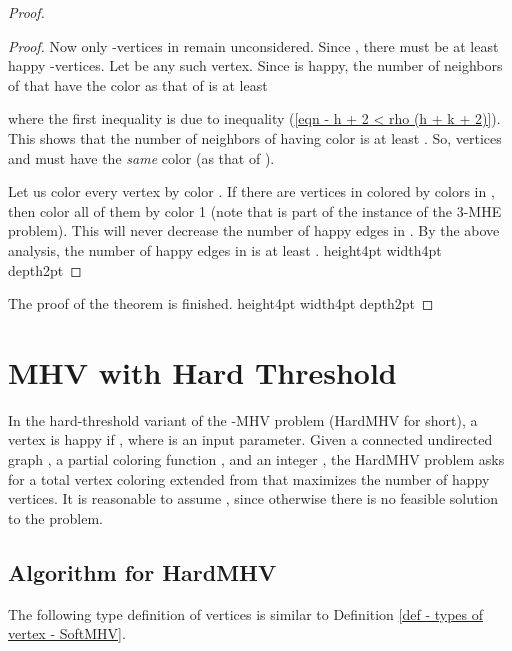 \documentclass[11pt]{article}
\newcommand{\qed}{\vrule height4pt width4pt depth2pt}
\begin{document}
\begin{proof}
\begin{proof}
Now only -vertices in  remain unconsidered.
Since , there must be at least 
happy -vertices. Let  be any such vertex.
Since  is happy, the number of neighbors of 
that have the color as that of  is at least

where the first inequality is due to inequality
(\ref{eqn - h + 2 < rho (h + k + 2)}).
This shows that the number of neighbors of  having color
 is at least . So, vertices  and  must have
the {\em same} color (as that of ).

Let us color every vertex  by color .
If there are vertices in  colored by colors in ,
then color all of them by color 1 (note that  is part of the instance of
the 3-MHE problem). This will never decrease the number of happy edges
in . By the above analysis, the number of happy edges in  is
at least .
\qed
\end{proof}

The proof of the theorem is finished.
\qed
\end{proof}




\section{MHV with Hard Threshold}
In the hard-threshold variant of the -MHV problem (HardMHV for short),
a vertex  is happy if , where  is an input
parameter.
Given a connected undirected graph , a partial coloring function ,
and an integer , the HardMHV problem asks for a total vertex coloring
extended from  that maximizes the number of happy vertices.
It is reasonable to assume , since otherwise
there is no feasible solution to the problem.




\subsection{Algorithm for HardMHV}
The following type definition of vertices is similar to
Definition \ref{def - types of vertex - SoftMHV}.
\end{document}
